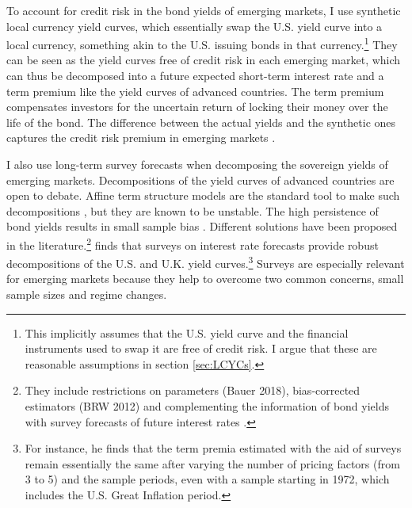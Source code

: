 {%
To account for credit risk in the bond yields of emerging markets, I use synthetic local currency yield curves, which essentially swap the U.S. yield curve into a local currency,
something akin to the U.S. issuing bonds in that currency.\footnote{ This implicitly assumes that the U.S. yield curve and the financial instruments used to swap it are free of credit risk. I argue that these are reasonable assumptions in section \ref{sec:LCYCs}.}
They can be seen as the yield curves free of credit risk in each emerging market, which can thus be decomposed into a 
future expected short-term interest rate and a term premium like the yield curves of advanced countries. 
The term premium compensates investors for the uncertain return of locking their money over the life of the bond.
The difference between the actual yields and the synthetic ones captures the credit risk premium in emerging markets \citep{DuSchreger:2016JoF}.

I also use long-term survey forecasts when decomposing the sovereign yields of emerging markets.
Decompositions of the yield curves of advanced countries are open to debate.
Affine term structure models are the standard tool to make such decompositions \citep{CochranePiazzesi:2008}, but they are known to be unstable.
The high persistence of bond yields results in small sample bias \citep{KimOrphanides:2012}.
Different solutions have been proposed in the literature.\footnote{ They include restrictions on parameters \citep{Duffee:2010} (Bauer 2018), bias-corrected estimators (BRW 2012) and complementing the information of bond yields with survey forecasts of future interest rates \citep{KimWright:2005,KimOrphanides:2012}.} 
\cite{Guimaraes:2014} finds that surveys on interest rate forecasts provide robust decompositions of the U.S. and U.K. yield curves.\footnote{ For instance, he finds that the term premia estimated with the aid of surveys remain essentially the same after varying the number of pricing factors (from 3 to 5) and the sample periods, even with a sample starting in 1972, which includes the U.S. Great Inflation period.} 
Surveys are especially relevant for emerging markets because they help to overcome two common concerns, small sample sizes and regime changes.

}
